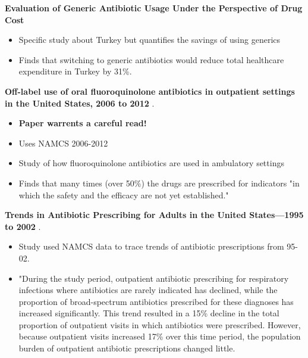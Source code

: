 



\let\counterwithout\relax
\let\counterwithin\relax
{}



\noindent\textbf{Evaluation of Generic Antibiotic Usage Under the Perspective of Drug Cost} \cite{mercanoglu_evaluation_2018}\\
\begin{itemize}
    \item Specific study about Turkey but quantifies the savings of using generics
    \item Finds that switching to generic antibiotics would reduce total healthcare expenditure in Turkey by 31\%.
\end{itemize}

\noindent\textbf{Off-label use of oral fluoroquinolone antibiotics in outpatient settings in the United States, 2006 to 2012} \cite{almalki_off-label_2016}.\\
\begin{itemize}
    \item \textbf{Paper warrents a careful read!}
    \item Uses NAMCS 2006-2012
    \item Study of how fluoroquinolone antibiotics are used in ambulatory settings
    \item Finds that many times (over 50\%) the drugs are prescribed for indicators "in which the safety and the efficacy are not yet established."
\end{itemize}

\noindent\textbf{Trends in Antibiotic Prescribing for Adults in the United States—1995 to 2002} \cite{roumie_trends_2005}.\\
\begin{itemize}
    \item Study used NAMCS data to trace trends of antibiotic prescriptions from 95-02.
    \item "During the study period, outpatient antibiotic prescribing for respiratory infections where antibiotics are rarely indicated has declined, while the proportion of broad-spectrum antibiotics prescribed for these diagnoses has increased significantly. This trend resulted in a 15\% decline in the total proportion of outpatient visits in which antibiotics were prescribed. However, because outpatient visits increased 17\% over this time period, the population burden of outpatient antibiotic prescriptions changed little.
\end{itemize}

